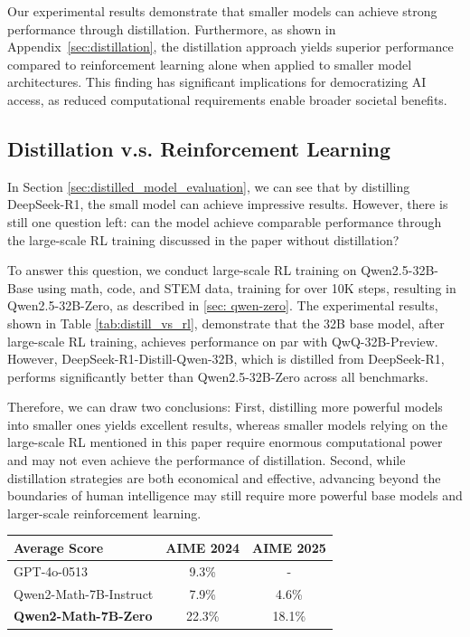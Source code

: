 Our experimental results demonstrate that smaller models can achieve strong performance through distillation. Furthermore, as shown in Appendix~\ref{sec:distillation}, the distillation approach yields superior performance compared to reinforcement learning alone when applied to smaller model architectures. This finding has significant implications for democratizing AI access, as reduced computational requirements enable broader societal benefits.

\subsection{Distillation v.s. Reinforcement Learning} 


In Section \ref{sec:distilled_model_evaluation}, we can see that by distilling DeepSeek-R1, the small model can achieve impressive results. However, there is still one question left: can the model achieve comparable performance through the large-scale RL training discussed in the paper without distillation?


To answer this question, we conduct large-scale RL training on Qwen2.5-32B-Base using math, code, and STEM data, training for over 10K steps, resulting in Qwen2.5-32B-Zero, as described in \ref{sec: qwen-zero}. The experimental results, shown in Table \ref{tab:distill_vs_rl}, demonstrate that the 32B base model, after large-scale RL training, achieves performance on par with QwQ-32B-Preview. However, DeepSeek-R1-Distill-Qwen-32B, which is distilled from DeepSeek-R1,  performs significantly better than Qwen2.5-32B-Zero across all benchmarks.

Therefore, we can draw two conclusions: First, distilling more powerful models into smaller ones yields excellent results, whereas smaller models relying on the large-scale RL mentioned in this paper require enormous computational power and may not even achieve the performance of distillation. Second, while distillation strategies are both economical and effective, advancing beyond the boundaries of human intelligence may still require more powerful base models and larger-scale reinforcement learning.



\begin{table}[t]
    \centering
    \begin{tabular}{l|cc} \toprule
    Average Score & 
    \textbf{AIME 2024} & \textbf{AIME 2025} \\
    \midrule
    GPT-4o-0513 & 9.3\% & -  \\
    Qwen2-Math-7B-Instruct & 7.9\% & 4.6\% \\
    \midrule
    \textbf{Qwen2-Math-7B-Zero} & 22.3\% & 18.1\% \\
    \bottomrule
    \end{tabular}
    \label{tab:zero-7b-math}
\end{table}


